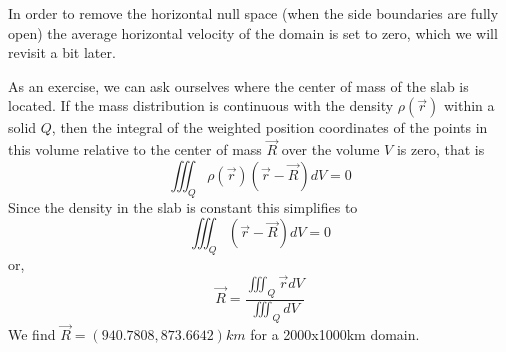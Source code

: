 In order to remove the horizontal null space (when the side boundaries are fully open) 
the average horizontal velocity of the domain is set to zero,
which we will revisit a bit later.

As an exercise, we can ask ourselves where the center of mass of the slab is located.
If the mass distribution is continuous with the density $\rho(\vec{r})$ 
within a solid $Q$, then the integral of the weighted position coordinates 
of the points in this volume relative to the center of mass $\vec{R}$ over the volume $V$ is zero, 
that is
\[
\iiint_Q \rho(\vec{r}) (\vec{r}-\vec{R}) dV =0
\]
Since the density in the slab is constant this simplifies to 
\[
\iiint_Q  (\vec{r}-\vec{R}) dV =0
\]
or, 
\[
\vec{R} = \frac{ \iiint_Q  \vec{r} dV}{\iiint_Q  dV}
\]
We find $\vec{R}=(940.7808, 873.6642)km$ for a 2000x1000km domain.




